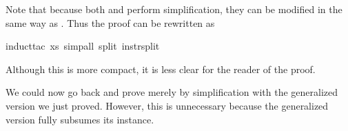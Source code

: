 \begin{isabellebody}
\endisatagproof
{\isafoldproof}%
%
\isadelimproof
%
\endisadelimproof
%
\begin{isamarkuptext}%
\noindent
Note that because both  and  perform simplification, they can
be modified in the same way as .  Thus the proof can be
rewritten as%
\end{isamarkuptext}%
\isamarkuptrue%
%
\isadelimproof
%
\endisadelimproof
%
\isatagproof
{}\isamarkupfalse%
{}induct{}tac\ xs{}\ simp{}all\ split{}\ instr{}split{}%
\endisatagproof
{\isafoldproof}%
%
\isadelimproof
%
\endisadelimproof
%
\begin{isamarkuptext}%
\noindent
Although this is more compact, it is less clear for the reader of the proof.

We could now go back and prove 
merely by simplification with the generalized version we just proved.
However, this is unnecessary because the generalized version fully subsumes
its instance.%
%
\end{isamarkuptext}%
\isamarkuptrue%
%
\isadelimproof
%
\endisadelimproof
%
\isatagproof
%
\endisatagproof
{\isafoldproof}%
%
\isadelimproof
%
\endisadelimproof
%
\isadelimtheory
%
\endisadelimtheory
%
\isatagtheory
%
\endisatagtheory
{\isafoldtheory}%
%
\isadelimtheory
%
\endisadelimtheory
\end{isabellebody}%
